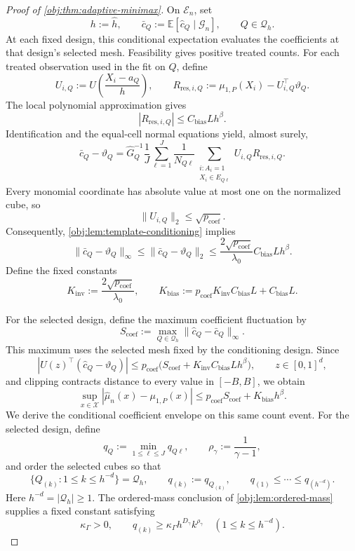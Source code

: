 \documentclass[11pt]{article}
\begin{document}
\begin{proof}[Proof of \cref{obj:thm:adaptive-minimax}]
On \(\mathcal E_n\), set
\[
h:=\widehat h,
\qquad
\bar c_Q:=\mathbb E[\widehat c_Q\mid\mathcal G_n],
\qquad Q\in\mathcal Q_h.
\]
At each fixed design, this conditional expectation evaluates the coefficients at that design's selected mesh. Feasibility gives positive treated counts. For each treated observation used in the fit on \(Q\), define
\[
U_{i,Q}:=U\!\left(\frac{X_i-a_Q}{h}\right),
\qquad
R_{\mathrm{res},i,Q}
:=\mu_{1,P}(X_i)-U_{i,Q}^{\top}\vartheta_Q.
\]
The local polynomial approximation gives
\[
|R_{\mathrm{res},i,Q}|\le C_{\mathrm{bias}}Lh^\beta.
\]
Identification and the equal-cell normal equations yield, almost surely,
\[
\bar c_Q-\vartheta_Q
=
\widehat G_Q^{-1}
\frac1J\sum_{\ell=1}^J\frac1{N_{Q\ell}}
\sum_{\substack{i:A_i=1\\X_i\in E_{Q\ell}}}
U_{i,Q}R_{\mathrm{res},i,Q}.
\]
Every monomial coordinate has absolute value at most one on the normalized cube, so
\[
\|U_{i,Q}\|_2\le\sqrt{p_{\mathrm{coef}}}.
\]
Consequently, \cref{obj:lem:template-conditioning} implies
\[
\|\bar c_Q-\vartheta_Q\|_\infty
\le
\|\bar c_Q-\vartheta_Q\|_2
\le
\frac{2\sqrt{p_{\mathrm{coef}}}}{\lambda_0}
C_{\mathrm{bias}}Lh^\beta.
\]
Define the fixed constants
\[
K_{\mathrm{inv}}
:=\frac{2\sqrt{p_{\mathrm{coef}}}}{\lambda_0},
\qquad
K_{\mathrm{bias}}
:=p_{\mathrm{coef}}K_{\mathrm{inv}}C_{\mathrm{bias}}L
+C_{\mathrm{bias}}L.
\]

For the selected design, define the maximum coefficient fluctuation by
\[
S_{\mathrm{coef}}
:=
\max_{Q\in\mathcal Q_h}
\|\widehat c_Q-\bar c_Q\|_\infty.
\]
This maximum uses the selected mesh fixed by the conditioning design. Since
\[
|U(z)^\top(\widehat c_Q-\vartheta_Q)|
\le
p_{\mathrm{coef}}
\bigl(S_{\mathrm{coef}}+K_{\mathrm{inv}}C_{\mathrm{bias}}Lh^\beta\bigr),
\qquad z\in[0,1]^d,
\]
and clipping contracts distance to every value in \([-B,B]\), we obtain
\[
\sup_{x\in\mathcal X}
|\widehat\mu_n(x)-\mu_{1,P}(x)|
\le
p_{\mathrm{coef}}S_{\mathrm{coef}}+K_{\mathrm{bias}}h^\beta.
\]
We derive the conditional coefficient envelope on this same count event. For the selected design, define
\[
q_Q:=\min_{1\le\ell\le J}q_{Q\ell},
\qquad
\rho_\gamma:=\frac1{\gamma-1},
\]
and order the selected cubes so that
\[
\{Q_{(k)}:1\le k\le h^{-d}\}=\mathcal Q_h,
\qquad
q_{(k)}:=q_{Q_{(k)}},
\qquad
q_{(1)}\le\cdots\le q_{(h^{-d})}.
\]
Here \(h^{-d}=|\mathcal Q_h|\ge1\). The ordered-mass conclusion of \cref{obj:lem:ordered-mass} supplies a fixed constant satisfying
\[
\kappa_\Gamma>0,
\qquad
q_{(k)}\ge\kappa_\Gamma h^{D_\gamma}k^{\rho_\gamma}
\quad(1\le k\le h^{-d}).
\]


\end{proof}
\end{document}
